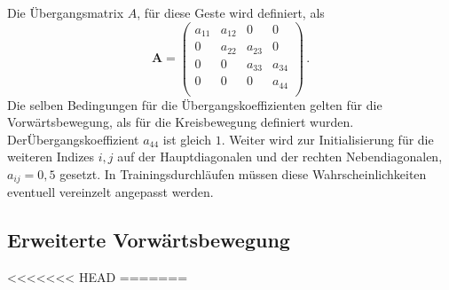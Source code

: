 Die \"Ubergangsmatrix $A$, f\"ur diese Geste wird definiert, als
\begin{equation}
\mathbf{A} = 
\begin{pmatrix}
a_{11} & a_{12} & 0 & 0\\
0 & a_{22} & a_{23} & 0 \\
0 & 0 & a_{33} & a_{34}\\
0 & 0 & 0 & a_{44} \\
\end{pmatrix} \, .
\end{equation}
Die selben Bedingungen f\"ur die \"Ubergangskoeffizienten gelten f\"ur die Vorw\"artsbewegung, als f\"ur die Kreisbewegung definiert wurden. 
\newline
Der\"Ubergangskoeffizient $a_{44}$ ist gleich $1$. Weiter wird zur Initialisierung f\"ur die weiteren Indizes $i, j$ auf der Hauptdiagonalen und der rechten Nebendiagonalen, $a_{ij} = 0,5$ gesetzt. In Trainingsdurchl\"aufen m\"ussen diese Wahrscheinlichkeiten eventuell vereinzelt angepasst werden.

\subsection{Erweiterte Vorw\"artsbewegung}
\label{subsec:gesture-extforward}
<<<<<<< HEAD
=======

